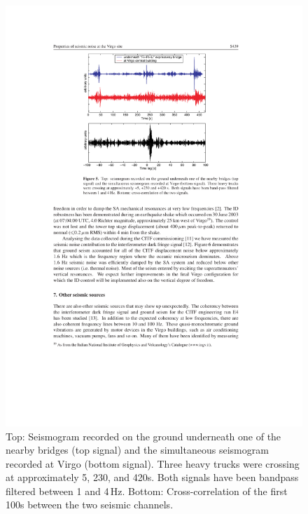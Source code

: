\begin{figure}[t!]
	\begin{center}
		\includegraphics[width=12cm]{./Sec_SiteInfra/Figures/VirgoRoadNoise.pdf}
		\caption{Top: Seismogram recorded on the ground underneath one of the nearby bridges (top signal) and the simultaneous seismogram recorded at Virgo (bottom signal). Three heavy trucks  were crossing at approximately 5, 230, and 420s. Both signals have been bandpass filtered between 1 and 4\,Hz. Bottom: Cross-correlation of the first 100s between the two seismic channels.}
		\label{roadnoise}
	\end{center}
\end{figure}

\FloatBarrier
